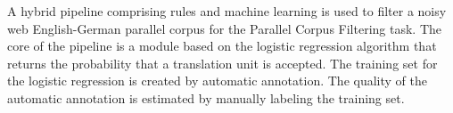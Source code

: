 A hybrid pipeline comprising rules and machine learning is used to filter a noisy web English-German parallel corpus for the Parallel Corpus Filtering task. The core of the pipeline is a module based on the logistic regression algorithm that returns the probability that a translation unit is accepted. The training set for the logistic regression is created by automatic annotation. The quality of the automatic annotation is estimated by manually labeling the training set.
